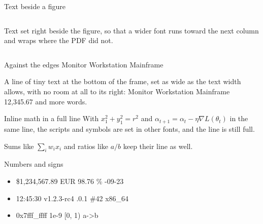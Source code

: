 \documentclass{beamer}
\begin{document}
\begin{frame}[label=beside]{Text beside a figure}
  \begin{columns}[c]
    Text set right beside the figure, so that a wider font runs toward the next column and
    wraps where the PDF did not.
  \end{columns}
\end{frame}

\begin{frame}[label=edges]{Against the edges}
  \hfill\Large Monitor Workstation Mainframe\par
  \vfill
  \tiny A line of tiny text at the bottom of the frame, set as wide as the text width allows,
  with no room at all to its right: Monitor Workstation Mainframe 12,345.67 and more words.
\end{frame}

\begin{frame}[label=inline-math]{Inline math in a full line}
  With $x_1^2 + y_1^2 = r^2$ and $\alpha_{t+1} = \alpha_t - \eta \nabla L(\theta_t)$ in the
  same line, the scripts and symbols are set in other fonts, and the line is still full.

  Sums like $\sum_i w_i x_i$ and ratios like $a/b$ keep their line as well.
\end{frame}

\begin{frame}[label=numbers]{Numbers and signs}
  \begin{itemize}
    \item \$1,234,567.89 \quad EUR 98.76  \% -09-23
    \item 12:45:30 \quad v1.2.3-rc4 .0.1 \quad \#42 \quad x86\_64
    \item {\ttfamily 0x7fff\_ffff \quad 1e-9 \quad [0, 1) \quad a->b}
  \end{itemize}
\end{frame}
\end{document}
